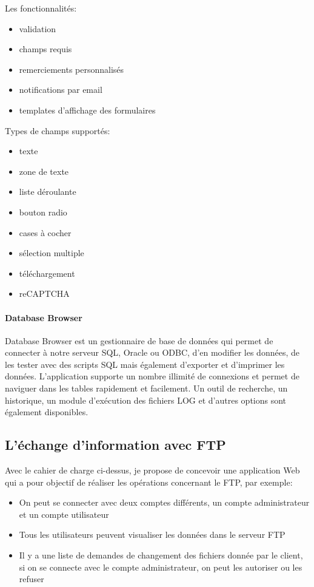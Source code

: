 Les fonctionnalités:
\begin{itemize}
\item validation
\item champs requis
\item remerciements personnalisés
\item notifications par email
\item templates d'affichage des formulaires\\
\end{itemize}

Types de champs supportés:
\begin{itemize}
\item texte
\item zone de texte
\item liste déroulante
\item bouton radio
\item cases à cocher
\item sélection multiple
\item téléchargement
\item reCAPTCHA
\end{itemize}

    \paragraph{Database Browser}
Database Browser est un gestionnaire de base de données qui permet de connecter à notre serveur SQL, Oracle ou ODBC, d'en modifier les données, de les tester avec des scripts SQL mais également d'exporter et d'imprimer les données. L'application supporte un nombre illimité de connexions et permet de naviguer dans les tables rapidement et facilement. Un outil de recherche, un historique, un module d'exécution des fichiers LOG et d'autres options sont également disponibles.

  \subsection{L’échange d’information avec FTP}
  \label{infoFTP}
Avec le cahier de charge ci-dessus, je propose de concevoir une application Web qui a pour objectif de réaliser les opérations concernant le FTP, par exemple:\\

\begin{itemize}
\item On peut se connecter avec deux comptes différents, un compte administrateur et un compte utilisateur
\item Tous les utilisateurs peuvent visualiser les données dans le serveur FTP
\item Il y a une liste de demandes de changement des fichiers donnée par le client, si on se connecte avec le compte administrateur, on peut les autoriser ou les refuser\\
\end{itemize}

